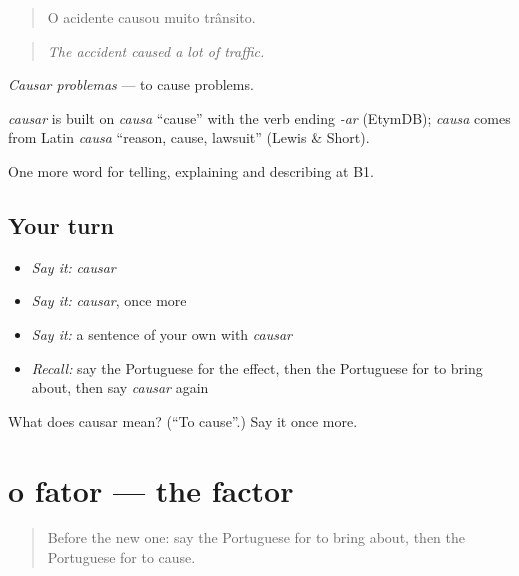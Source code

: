 \begin{quote}
O acidente causou muito trânsito.
\end{quote}

\begin{quote}
\emph{The accident caused a lot of traffic.}
\end{quote}

\emph{Causar problemas} — to cause problems.

\begin{cousinweb}
\emph{causar} is built on \emph{causa} \textquotedblleft{}cause\textquotedblright{} with the verb ending \emph{-ar} (EtymDB); \emph{causa} comes from Latin \emph{causa} \textquotedblleft{}reason, cause, lawsuit\textquotedblright{} (Lewis \& Short).
\end{cousinweb}

\begin{grammarlens}[title={What you've built}]
One more word for telling, explaining and describing at B1.
\end{grammarlens}

\subsection*{Your turn}
\begin{itemize}
\raggedright
  \item \emph{Say it:} \emph{causar}
  \item \emph{Say it:} \emph{causar}, once more
  \item \emph{Say it:} a sentence of your own with \emph{causar}
  \item \emph{Recall:} say the Portuguese for the effect, then the Portuguese for to bring about, then say \emph{causar} again
\end{itemize}

\begin{tcolorbox}[breakable,colback=teal!4,colframe=teal!35!black,title={Before you move on}]
What does causar mean? (\textquotedblleft{}To cause\textquotedblright{}.) Say it once more.
\end{tcolorbox}
\section[o fator]{o fator — the factor}

\label{lesson:PT-C348-fator}



\begin{quote}
Before the new one: say the Portuguese for to bring about, then the Portuguese for to cause.
\end{quote}

